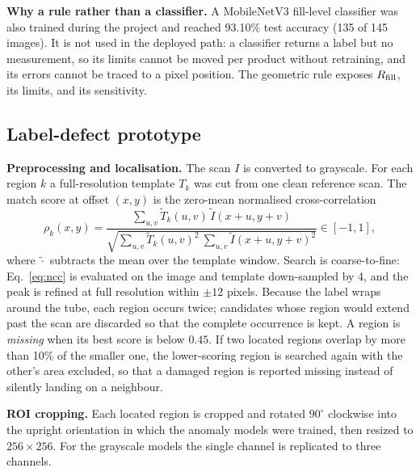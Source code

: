 \noindent\textbf{Why a rule rather than a classifier.} A MobileNetV3 fill-level classifier was also trained during the project and reached 93.10\% test accuracy (135 of 145 images). It is not used in the deployed path: a classifier returns a label but no measurement, so its limits cannot be moved per product without retraining, and its errors cannot be traced to a pixel position. The geometric rule exposes $R_{\mathrm{fill}}$, its limits, and its sensitivity.

\subsection{Label-defect prototype}
\label{sec:label-impl}

\noindent\textbf{Preprocessing and localisation.} The scan $I$ is converted to grayscale. For each region $k$ a full-resolution template $T_k$ was cut from one clean reference scan. The match score at offset $(x,y)$ is the zero-mean normalised cross-correlation~\cite{lewis1995}
\begin{equation}
    \rho_k(x,y) = \frac{\sum_{u,v}\tilde T_k(u,v)\,\tilde I(x+u,y+v)}
    {\sqrt{\sum_{u,v}\tilde T_k(u,v)^2\ \sum_{u,v}\tilde I(x+u,y+v)^2}}\in[-1,1],
    \label{eq:ncc}
\end{equation}
where $\tilde{\cdot}$ subtracts the mean over the template window. Search is coarse-to-fine: Eq.~\eqref{eq:ncc} is evaluated on the image and template down-sampled by 4, and the peak is refined at full resolution within $\pm12$ pixels. Because the label wraps around the tube, each region occurs twice; candidates whose region would extend past the scan are discarded so that the complete occurrence is kept. A region is \emph{missing} when its best score is below $0.45$. If two located regions overlap by more than 10\% of the smaller one, the lower-scoring region is searched again with the other's area excluded, so that a damaged region is reported missing instead of silently landing on a neighbour.

\noindent\textbf{ROI cropping.} Each located region is cropped and rotated $90^\circ$ clockwise into the upright orientation in which the anomaly models were trained, then resized to $256{\times}256$. For the grayscale models the single channel is replicated to three channels.

